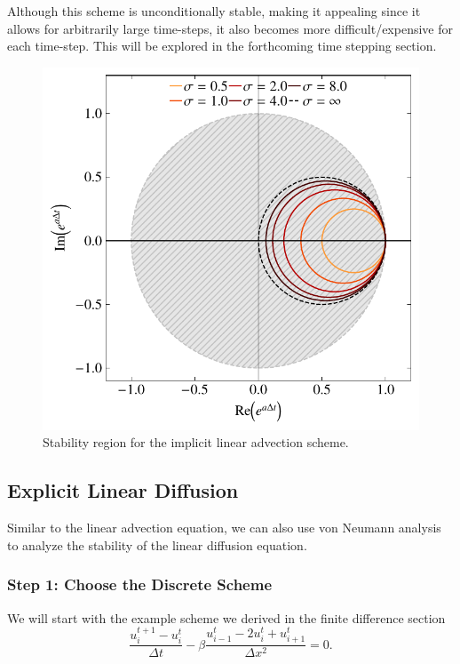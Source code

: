 \begin{remark}
Although this scheme is unconditionally stable, making it appealing since it allows for arbitrarily large time-steps, it also becomes more difficult/expensive for each time-step. This will be explored in the forthcoming time stepping section.
\end{remark}

\begin{figure}[htbp]
	\centering
	\includegraphics[width=0.6\linewidth]{Pictures/implicit_advection}
	\caption{Stability region for the implicit linear advection scheme.}
	\label{fig:implicit_advection}
\end{figure}

\subsection{Explicit Linear Diffusion}
Similar to the linear advection equation, we can also use von Neumann analysis to analyze the stability of the linear diffusion equation. 

\subsubsection{Step 1: Choose the Discrete Scheme}
We will start with the example scheme we derived in the finite difference section
\begin{equation}
  \frac{u_i^{t+1} - u_{i}^t}{\Delta t} - \beta \frac{u_{i-1}^t - 2u_i^t + u_{i+1}^t}{\Delta x^2} = 0.
\end{equation}

